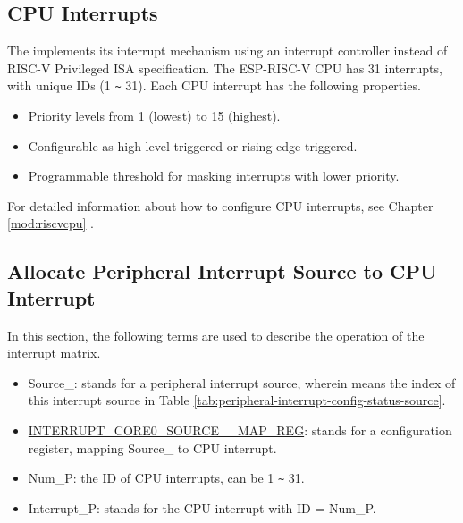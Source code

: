 \documentclass[main\_\_EN.tex]{subfiles}
\begin{document}
\subsection{CPU Interrupts}

The \chipname{} implements its interrupt mechanism using an interrupt controller instead of RISC-V Privileged ISA specification. The ESP-RISC-V CPU has 31 interrupts, with unique IDs (1 \verb+~+ 31). Each CPU interrupt has the following properties. 

\begin{itemize}
    \item Priority levels from 1 (lowest) to 15 (highest).
    \item Configurable as high-level triggered or rising-edge triggered.
    \item Programmable threshold for masking interrupts with lower priority. 
\end{itemize}


\begin{tiplisting}
For detailed information about how to configure CPU interrupts, see Chapter \ref{mod:riscvcpu} \textit{}. 
\end{tiplisting}

\subsection{Allocate Peripheral Interrupt Source to CPU Interrupt}

In this section, the following terms are used to describe the operation of the interrupt matrix.

\begin{itemize}

\item Source\_: stands for a peripheral interrupt source, wherein  means the index of this interrupt source in Table \ref{tab:peripheral-interrupt-config-status-source}.

\item \hyperref[regdesc:INTERRUPTCORE0PIFPMSMONITORVIOLATESIZEINTRMAPREG]{INTERRUPT\_CORE0\_SOURCE\_\_MAP\_REG}: stands for a configuration register, mapping Source\_ to CPU interrupt.

\item Num\_P: the ID of CPU interrupts, can be 1 \verb+~+ 31.

\item Interrupt\_P: stands for the CPU interrupt with ID = Num\_P.

\end{itemize}
\end{document}

